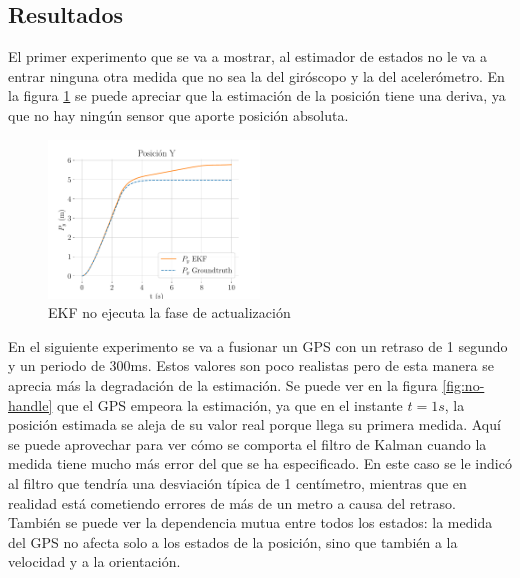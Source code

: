 \subsection{Resultados}

El primer experimento que se va a mostrar, al estimador de estados no le va a entrar ninguna otra medida que no sea la del giróscopo y la del acelerómetro. En la figura \ref{fig:simu1} se puede apreciar que la estimación de la posición tiene una deriva, ya que no hay ningún sensor que aporte posición absoluta. 


\begin{figure}[b]	
	\centering
		\centering
		\includegraphics[width=0.5\textwidth]{estimador_px4/im_simu/n_update/y_t}
	\quad
	\caption{EKF no ejecuta la fase de actualización}
	\label{fig:simu1}
\end{figure}


En el siguiente experimento se va a fusionar un GPS con un retraso de 1 segundo y un periodo de 300ms. Estos valores son poco realistas pero de esta manera se aprecia más la degradación de la estimación. Se puede ver en la figura \ref{fig:no-handle} que el GPS empeora la estimación, ya que en el instante $t=1s$, la posición estimada se aleja de su valor real porque llega su primera medida. Aquí se puede aprovechar para ver cómo se comporta el filtro de Kalman cuando la medida tiene mucho más error del que se ha especificado. En este caso se le indicó al filtro que tendría una desviación típica de 1 centímetro, mientras que en realidad está cometiendo errores de más de un metro a causa del retraso. También se puede ver la dependencia mutua entre todos los estados: la medida del GPS no afecta solo a los estados de la posición, sino que también a la velocidad y a la orientación.  

